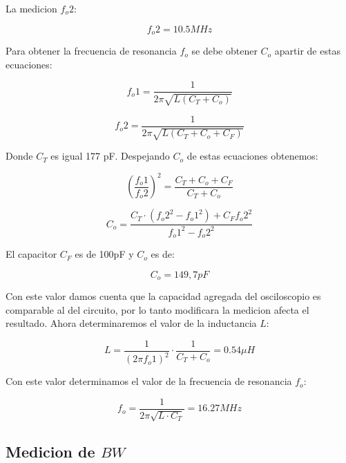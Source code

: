 La medicion $f_o2$:

\begin{equation}
    f_o2 = 10.5 MHz
\end{equation}

Para obtener la frecuencia de resonancia $f_o$ se debe obtener $C_o$ apartir de estas ecuaciones:

\begin{equation}
    f_o1 = \frac{1}{2\pi\sqrt{L(C_T + C_o)}}
\end{equation}

\begin{equation}
    f_o2 = \frac{1}{2\pi\sqrt{L(C_T + C_o + C_F)}}
\end{equation}

Donde $C_T$ es igual 177 pF. Despejando $C_o$ de estas ecuaciones obtenemos:

\begin{equation}
    (\frac{f_o1}{f_o2})^2 = \frac{C_T + C_o + C_F}{C_T + C_o}
\end{equation}

\begin{equation}
    C_o = \frac{C_T \cdot (f_o2^2 - f_o1^2) + C_F f_o2^2}{f_o1^2 - f_o2^2}
\end{equation}

El capacitor $C_F$ es de 100pF y $C_o$ es de:

\begin{equation}
    C_o = 149,7 pF
\end{equation}

Con este valor damos cuenta que la capacidad agregada del osciloscopio es comparable al del circuito, por lo tanto modificara la medicion afecta el resultado.
Ahora determinaremos el valor de la inductancia $L$:

\begin{equation}
    L = \frac{1}{(2\pi f_o1)^2} \cdot \frac{1}{C_T + C_o} = 0.54 \mu H
\end{equation}

Con este valor determinamos el valor de la frecuencia de resonancia $f_o$:

\begin{equation}
    f_o = \frac{1}{2\pi\sqrt{L \cdot C_T}} = 16.27 MHz
\end{equation}

\subsection{Medicion de $BW$}


